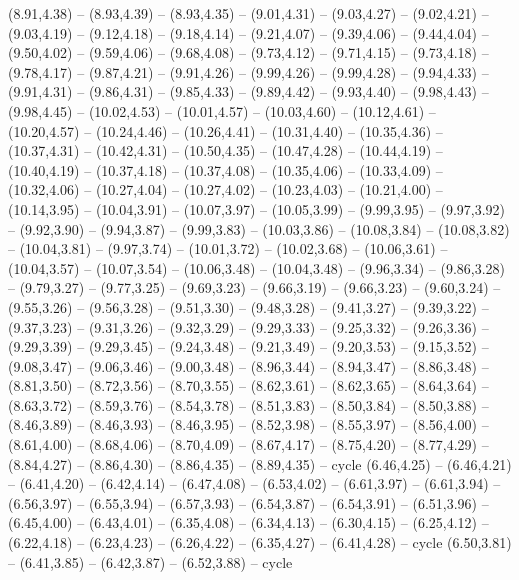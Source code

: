 \expandafter\def\csname geo:gebiet:CHN\endcsname{
  (8.91,4.38) -- (8.93,4.39) -- (8.93,4.35) -- (9.01,4.31) -- (9.03,4.27) -- (9.02,4.21) -- (9.03,4.19) -- (9.12,4.18) -- (9.18,4.14) -- (9.21,4.07) -- (9.39,4.06) -- (9.44,4.04) -- (9.50,4.02) -- (9.59,4.06) -- (9.68,4.08) -- (9.73,4.12) -- (9.71,4.15) -- (9.73,4.18) -- (9.78,4.17) -- (9.87,4.21) -- (9.91,4.26) -- (9.99,4.26) -- (9.99,4.28) -- (9.94,4.33) -- (9.91,4.31) -- (9.86,4.31) -- (9.85,4.33) -- (9.89,4.42) -- (9.93,4.40) -- (9.98,4.43) -- (9.98,4.45) -- (10.02,4.53) -- (10.01,4.57) -- (10.03,4.60) -- (10.12,4.61) -- (10.20,4.57) -- (10.24,4.46) -- (10.26,4.41) -- (10.31,4.40) -- (10.35,4.36) -- (10.37,4.31) -- (10.42,4.31) -- (10.50,4.35) -- (10.47,4.28) -- (10.44,4.19) -- (10.40,4.19) -- (10.37,4.18) -- (10.37,4.08) -- (10.35,4.06) -- (10.33,4.09) -- (10.32,4.06) -- (10.27,4.04) -- (10.27,4.02) -- (10.23,4.03) -- (10.21,4.00) -- (10.14,3.95) -- (10.04,3.91) -- (10.07,3.97) -- (10.05,3.99) -- (9.99,3.95) -- (9.97,3.92) -- (9.92,3.90) -- (9.94,3.87) -- (9.99,3.83) -- (10.03,3.86) -- (10.08,3.84) -- (10.08,3.82) -- (10.04,3.81) -- (9.97,3.74) -- (10.01,3.72) -- (10.02,3.68) -- (10.06,3.61) -- (10.04,3.57) -- (10.07,3.54) -- (10.06,3.48) -- (10.04,3.48) -- (9.96,3.34) -- (9.86,3.28) -- (9.79,3.27) -- (9.77,3.25) -- (9.69,3.23) -- (9.66,3.19) -- (9.66,3.23) -- (9.60,3.24) -- (9.55,3.26) -- (9.56,3.28) -- (9.51,3.30) -- (9.48,3.28) -- (9.41,3.27) -- (9.39,3.22) -- (9.37,3.23) -- (9.31,3.26) -- (9.32,3.29) -- (9.29,3.33) -- (9.25,3.32) -- (9.26,3.36) -- (9.29,3.39) -- (9.29,3.45) -- (9.24,3.48) -- (9.21,3.49) -- (9.20,3.53) -- (9.15,3.52) -- (9.08,3.47) -- (9.06,3.46) -- (9.00,3.48) -- (8.96,3.44) -- (8.94,3.47) -- (8.86,3.48) -- (8.81,3.50) -- (8.72,3.56) -- (8.70,3.55) -- (8.62,3.61) -- (8.62,3.65) -- (8.64,3.64) -- (8.63,3.72) -- (8.59,3.76) -- (8.54,3.78) -- (8.51,3.83) -- (8.50,3.84) -- (8.50,3.88) -- (8.46,3.89) -- (8.46,3.93) -- (8.46,3.95) -- (8.52,3.98) -- (8.55,3.97) -- (8.56,4.00) -- (8.61,4.00) -- (8.68,4.06) -- (8.70,4.09) -- (8.67,4.17) -- (8.75,4.20) -- (8.77,4.29) -- (8.84,4.27) -- (8.86,4.30) -- (8.86,4.35) -- (8.89,4.35) -- cycle}
\expandafter\def\csname geo:gebiet:TWN\endcsname{
  }
\expandafter\def\csname geo:gebiet:ITA\endcsname{
  (6.46,4.25) -- (6.46,4.21) -- (6.41,4.20) -- (6.42,4.14) -- (6.47,4.08) -- (6.53,4.02) -- (6.61,3.97) -- (6.61,3.94) -- (6.56,3.97) -- (6.55,3.94) -- (6.57,3.93) -- (6.54,3.87) -- (6.54,3.91) -- (6.51,3.96) -- (6.45,4.00) -- (6.43,4.01) -- (6.35,4.08) -- (6.34,4.13) -- (6.30,4.15) -- (6.25,4.12) -- (6.22,4.18) -- (6.23,4.23) -- (6.26,4.22) -- (6.35,4.27) -- (6.41,4.28) -- cycle
  (6.50,3.81) -- (6.41,3.85) -- (6.42,3.87) -- (6.52,3.88) -- cycle}
